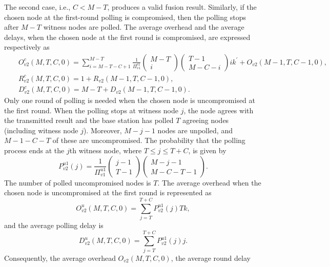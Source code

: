 \documentclass[12pt, onecolumn, draftcls]{IEEEtran}
\begin{document}
The second case, i.e., $C<M-T$, produces a valid fusion result.
Similarly, if the chosen node at the first-round polling is
compromised, then the polling stops after $M-T$ witness nodes are
polled. The average overhead and the average delays, when the chosen
node at the first round is compromised, are expressed respectively
as
\begin{eqnarray*}
&&O_{v2}^c(M,T,C,0)=\sum_{i=M-T-C+1}^{M-T}\frac{1}{\Pi_{v1}^{c1}}{\left(\begin{array}{c}
M-T
\\ i
\end{array}\right) \left(\begin{array}{c} T-1 \\M-C-i
\end{array}\right)}i k^{\prime}+ O_{v2}(M-1,T,C-1,0),\\
&&R_{v2}^c(M,T,C,0)=1+ R_{v2}(M-1,T,C-1,0),\\
&&D_{v2}^c(M,T,C,0)=M-T+ D_{v2}(M-1,T,C-1,0).
\end{eqnarray*}
Only one round of polling is needed when the chosen node is
uncompromised at the first round. When the polling stops at witness
node $j$, the node agrees with the transmitted result and the base
station has polled $T$ agreeing nodes (including witness node $j$).
Moreover, $M-j-1$ nodes are unpolled, and $M-1-C-T$ of these are
uncompromised. The probability that the polling process ends at the
$j$th witness node, where $T \le j \le T+C$, is given by
\begin{equation*}
P_{v2}^{u1}(j) = \frac{1}{\Pi_{v1}^{u1}}\left(\begin{array}{c} j-1 \\
T-1
\end{array}\right) \left(\begin{array}{c} M-j-1 \\ M-C-T-1
\end{array}\right).
\end{equation*}
The number of polled uncompromised nodes is $T$. The average
overhead when the chosen node is uncompromised at the first round is
represented as
\begin{equation*}
O_{v2}^u(M,T,C,0)=\sum_{j=T}^{T+C} P_{v2}^{u1}(j) Tk,
\end{equation*}
and the average polling delay is
\begin{equation*}
D_{v2}^u(M,T,C,0)=\sum_{j=T}^{T+C} P_{v2}^{u1}(j) j.
\end{equation*}
 Consequently, the average
overhead $O_{v2}(M,T,C,0)$, the average round delay
\end{document}
